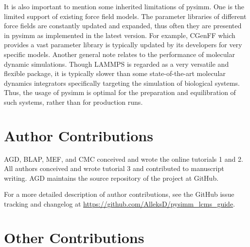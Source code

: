 \documentclass[9pt,tutorial]{livecoms}
\newcommand{\githubrepository}{\url{https://github.com/AlleksD/pysimm_lcms_guide}}
\begin{document}
It is also important to mention some inherited limitations of pysimm. One is the limited support of existing force field models. The parameter libraries of different force fields are constantly updated and expanded, thus often they are presented in pysimm as implemented in the latest version. For example, CGenFF which provides a vast parameter library is typically updated by its developers for very specific models. Another general note relates to the performance of molecular dynamic simulations. Though  LAMMPS is regarded as a very versatile and flexible package, it is typically slower than some state-of-the-art molecular dynamics integrators specifically targeting the simulation of biological systems. Thus, the usage of pysimm is optimal for the preparation and equilibration of such systems, rather than for production runs.


\section{Author Contributions}
%

AGD, BLAP, MEF, and CMC conceived and wrote the online tutorials 1 and 2. All authors conceived and wrote tutorial 3 and contributed to manuscript writing. AGD maintains the source repository of the project at GitHub.

For a more detailed description of author contributions, see the GitHub issue tracking and changelog at \githubrepository.

\section{Other Contributions}
%
\end{document}
